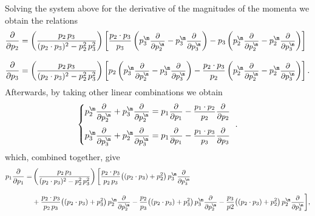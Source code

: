 \documentclass[a4paper,11pt,openright,twoside]{book}
\newcommand{\sdfrac}[2]{\mbox{\small$\displaystyle\frac{#1}{#2}$}}
\numberwithin{equation}{section}
\begin{document}
{{Solving the system above for the derivative of the magnitudes of the momenta we obtain the relations
\begin{subequations}
	\begin{align}
		\frac{\partial}{\partial p_2}&=\left(\frac{p_2\,p_3}{(p_2\cdot p_3)^2-p_2^2\,p_3^2}\right)\left[\frac{p_2\cdot p_3}{p_3}\left(p_3^\m\sdfrac{\partial}{\partial p_2^\m}-p_3^\m\sdfrac{\partial}{\partial p_3^\m}\right)-p_3\left(p_2^\m\sdfrac{\partial}{\partial p_2^\m}-p_2^\m\sdfrac{\partial}{\partial p_3^\m}\right)\right]\\[2ex]
		\frac{\partial}{\partial p_3}&=\left(\frac{p_2\,p_3}{(p_2\cdot p_3)^2-p_2^2\,p_3^2}\right)\left[p_2\left(p_3^\m\sdfrac{\partial}{\partial p_2^\m}-p_3^\m\sdfrac{\partial}{\partial p_3^\m}\right)-\frac{p_2\cdot p_3}{p_2}\left(p_2^\m\sdfrac{\partial}{\partial p_2^\m}-p_2^\m\sdfrac{\partial}{\partial p_3^\m}\right)\right].
	\end{align}\label{p2p3}
\end{subequations}
Afterwards, by taking other linear combinations we obtain
\begin{align}
	\left\{\begin{matrix}
		p_2^\m\sdfrac{\partial}{\partial p_2^\m}+p_3^\m\sdfrac{\partial}{\partial p_2^\m}=p_1\sdfrac{\partial}{\partial p_1}-\sdfrac{p_1\cdot p_2}{p_2}\sdfrac{\partial}{\partial p_2}\\[3ex]
		p_3^\m\sdfrac{\partial}{\partial p_3^\m}+p_2^\m\sdfrac{\partial}{\partial p_3^\m}=p_1\sdfrac{\partial}{\partial p_1}-\sdfrac{p_1\cdot p_3}{p_3}\sdfrac{\partial}{\partial p_3}
	\end{matrix}\right.\ .
\end{align}
which, combined together, give
\begin{align}
	p_1\frac{\partial}{\partial p_1}=&\left(\frac{p_2\,p_3}{(p_2\cdot p_3)^2-p_2^2\,p_3^2}\right)\bigg[\frac{p_2\cdot p_3}{p_2\,p_3}\big((p_2\cdot p_3)+p_2^2\big)\,p_3^\m\sdfrac{\partial}{\partial p_3^\m}\notag\\[2ex]
	&+\frac{p_2\cdot p_3}{p_2\,p_3}\big((p_2\cdot p_3)+p_3^2\big)\,p_2^\m\sdfrac{\partial}{\partial p_2^\m}-\frac{p_2}{p_3}\big((p_2\cdot p_3)+p_3^2\big)\,p_3^\m\sdfrac{\partial}{\partial p_2^\m}-\frac{p_3}{p2}\big((p_2\cdot p_3)+p_2^2\big)\,p_2^\m\sdfrac{\partial}{\partial p_3^\m}\bigg],\label{p1}
\end{align}

}}
\end{document}
